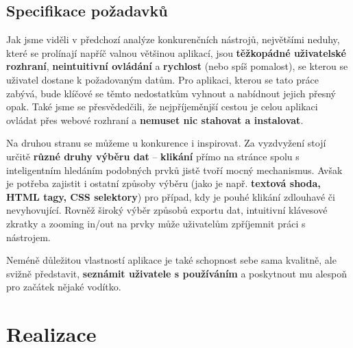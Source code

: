 \documentclass[thesis=B,czech]{FITthesis}[2012/06/26]
\begin{document}
\newpage
\section{Specifikace požadavků}
Jak jsme viděli v předchozí analýze konkurenčních nástrojů, největšími neduhy, které se prolínají napříč valnou většinou aplikací, jsou \textbf{těžkopádné uživatelské rozhraní}, \textbf{neintuitivní ovládání} a \textbf{rychlost} (nebo spíš pomalost), se kterou se uživatel dostane k požadovaným datům. Pro aplikaci, kterou se tato práce zabývá, bude klíčové se těmto nedostatkům vyhnout a nabídnout jejich přesný opak. Také jsme se přesvědedčili, že nejpříjeměnjší cestou je celou aplikaci ovládat přes webové rozhraní a \textbf{nemuset nic stahovat a instalovat}.

Na druhou stranu se můžeme u konkurence i inspirovat. Za vyzdvyžení stojí určitě \textbf{různé druhy výběru dat} -- \textbf{klikání} přímo na stránce spolu s inteligentním hledáním podobných prvků jistě tvoří mocný mechanismus. Avšak je potřeba zajistit i ostatní způsoby výběru (jako je např. \textbf{textová shoda, HTML tagy, CSS selektory}) pro případ, kdy je pouhé klikání zdlouhavé či nevyhovující. Rovněž široký výběr způsobů exportu dat, intuitivní klávesové zkratky a zooming in/out na prvky může uživatelům zpříjemnit práci s nástrojem.

Neméně důležitou vlastností aplikace je také schopnost sebe sama kvalitně, ale svižně představit, \textbf{seznámit uživatele s používáním} a poskytnout mu alespo\v{n} pro začátek nějaké vodítko.




\chapter{Realizace}




\begin{conclusion}
\end{conclusion}




\appendix


\end{document}
